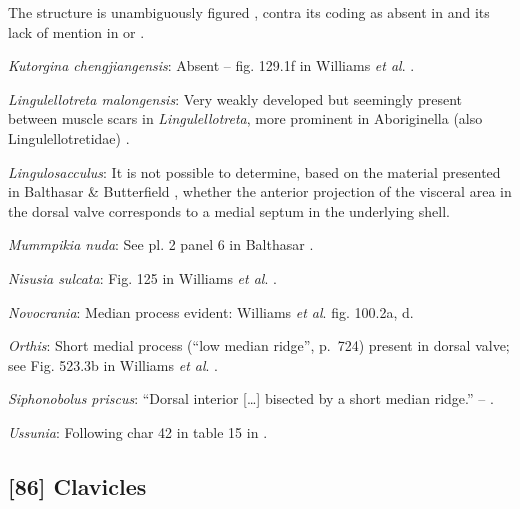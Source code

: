 \documentclass[openany]{book}
\theoremstyle{definition}
\theoremstyle{definition}
\theoremstyle{definition}
\theoremstyle{remark}
\begin{document}
The structure is unambiguously figured \citep[e.g.~fig. 5.1
in][]{Chen2007Reinterpretationof}, contra its coding as absent in
\citet{Williams2000LinguliformeaCraniiformea} and its lack of mention in
\citet{Williams2007Supplement} or \citet{Zhang2009Architectureand}.

\hypertarget{Kutorgina_chengjiangensis-coding-85}{}
\emph{Kutorgina chengjiangensis}: Absent -- fig. 129.1f in Williams
\emph{et al}. \citeyearpar{Williams2000LinguliformeaCraniiformea}.

\hypertarget{Lingulellotreta_malongensis-coding-85}{}
\emph{Lingulellotreta malongensis}: Very weakly developed but seemingly
present between muscle scars in \emph{Lingulellotreta}, more prominent
in Aboriginella (also Lingulellotretidae) \citep[fig.
34]{Williams2000LinguliformeaCraniiformea}.

\hypertarget{Lingulosacculus-coding-85}{}
\emph{Lingulosacculus}: It is not possible to determine, based on the
material presented in Balthasar \& Butterfield
\citeyearpar{Balthasar2009EarlyCambrian}, whether the anterior
projection of the visceral area in the dorsal valve corresponds to a
medial septum in the underlying shell.

\hypertarget{Mummpikia_nuda-coding-85}{}
\emph{Mummpikia nuda}: See pl. 2 panel 6 in Balthasar
\citeyearpar{Balthasar2008iMummpikia}.

\hypertarget{Nisusia_sulcata-coding-85}{}
\emph{Nisusia sulcata}: Fig. 125 in Williams \emph{et al}.
\citeyearpar{Williams2000LinguliformeaCraniiformea}.

\hypertarget{Novocrania-coding-85}{}
\emph{Novocrania}: Median process evident: Williams \emph{et al}.
\citeyearpar{Williams2000LinguliformeaCraniiformea} fig. 100.2a, d.

\hypertarget{Orthis-coding-85}{}
\emph{Orthis}: Short medial process (``low median ridge'', p.~724)
present in dorsal valve; see Fig. 523.3b in Williams \emph{et al}.
\citeyearpar{Williams2000LinguliformeaCraniiformea}.

\hypertarget{Siphonobolus_priscus-coding-85}{}
\emph{Siphonobolus priscus}: ``Dorsal interior {[}\ldots{}{]} bisected
by a short median ridge.'' -- \citet{Popov2009Earlyontogeny}.

\hypertarget{Ussunia-coding-85}{}
\emph{Ussunia}: Following char 42 in table 15 in
\citet{Williams2000LinguliformeaCraniiformea}.

\subsection*{{[}86{]} Clavicles}\label{clavicles}
\end{document}
